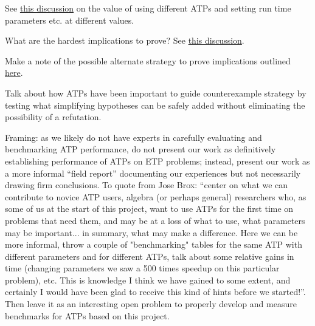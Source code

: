 See \href{https://leanprover.zulipchat.com/#narrow/channel/458659-Equational/topic/1516.20-.3E.20255/near/481547543}{this discussion} on the value of using different ATPs and setting run time parameters etc. at different values.

What are the hardest implications to prove?  See \href{https://leanprover.zulipchat.com/#narrow/channel/458659-Equational/topic/What.20are.20the.20hardest.20positive.20implications.20for.20an.20ATP.3F}{this discussion}.

Make a note of the possible alternate strategy to prove implications outlined \href{https://leanprover.zulipchat.com/#narrow/stream/458659-Equational/topic/Ideas.20for.20unknown.20implications}{here}.

Talk about how ATPs have been important to guide counterexample strategy by testing what simplifying hypotheses can be safely added without eliminating the possibility of a refutation.

Framing: as we likely do not have experts in carefully evaluating and benchmarking ATP performance, do not present our work as definitively establishing performance of ATPs on ETP problems; instead, present our work as a more informal ``field report'' documenting our experiences but not necessarily drawing firm conclusions.  To quote from Jose Brox: ``center on what we can contribute to novice ATP users, algebra (or perhaps general) researchers who, as some of us at the start of this project, want to use ATPs for the first time on problems that need them, and may be at a loss of what to use, what parameters may be important... in summary, what may make a difference. Here we can be more informal, throw a couple of "benchmarking" tables for the same ATP with different parameters and for different ATPs, talk about some relative gains in time (changing parameters we saw a 500 times speedup on this particular problem), etc. This is knowledge I think we have gained to some extent, and certainly I would have been glad to receive this kind of hints before we started!''.  Then leave it as an interesting open problem to properly develop and measure benchmarks for ATPs based on this project.
